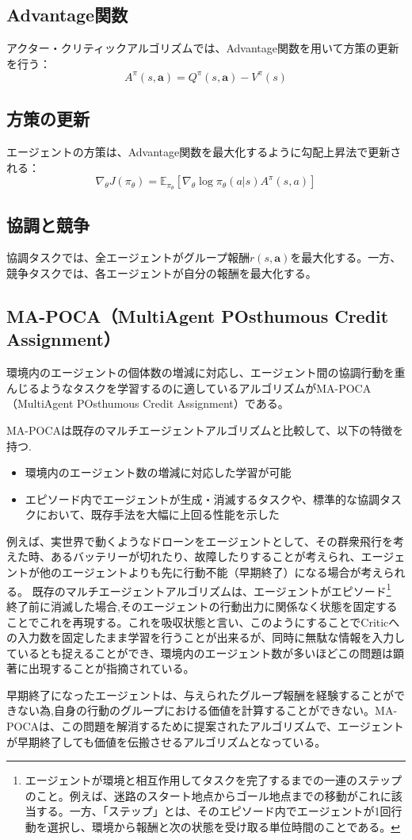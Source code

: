\subsection*{Advantage関数}
アクター・クリティックアルゴリズムでは、Advantage関数を用いて方策の更新を行う：
\[
A^\pi(s, \boldsymbol{a}) = Q^\pi(s, \boldsymbol{a}) - V^\pi(s)
\]

\subsection*{方策の更新}
エージェントの方策は、Advantage関数を最大化するように勾配上昇法で更新される：
\[
\nabla_\theta J(\pi_\theta) = \mathbb{E}_{\pi_\theta} \left[ \nabla_\theta \log \pi_\theta(a | s) A^\pi(s, a) \right]
\]

\subsection*{協調と競争}
協調タスクでは、全エージェントがグループ報酬$r(s, \boldsymbol{a})$を最大化する。一方、競争タスクでは、各エージェントが自分の報酬を最大化する。

\subsection{MA-POCA（MultiAgent POsthumous Credit Assignment）}
  環境内のエージェントの個体数の増減に対応し、エージェント間の協調行動を重んじるようなタスクを学習するのに適しているアルゴリズムがMA-POCA（MultiAgent POsthumous Credit Assignment）\cite{mapoca}である。\par 
  MA-POCAは既存のマルチエージェントアルゴリズムと比較して、以下の特徴を持つ.
  \begin{itemize}
    \item 環境内のエージェント数の増減に対応した学習が可能
    \item エピソード内でエージェントが生成・消滅するタスクや、標準的な協調タスクにおいて、既存手法を大幅に上回る性能を示した
  \end{itemize}
  例えば、実世界で動くようなドローンをエージェントとして、その群衆飛行を考えた時、あるバッテリーが切れたり、故障したりすることが考えられ、エージェントが他のエージェントよりも先に行動不能（早期終了）になる場合が考えられる。
  既存のマルチエージェントアルゴリズムは、エージェントがエピソード\footnote{エージェントが環境と相互作用してタスクを完了するまでの一連のステップのこと。例えば、迷路のスタート地点からゴール地点までの移動がこれに該当する。一方、「ステップ」とは、そのエピソード内でエージェントが1回行動を選択し、環境から報酬と次の状態を受け取る単位時間のことである。}
  終了前に消滅した場合,そのエージェントの行動出力に関係なく状態を固定することでこれを再現する。これを吸収状態と言い、このようにすることでCriticへの入力数を固定したまま学習を行うことが出来るが、同時に無駄な情報を入力しているとも捉えることができ、環境内のエージェント数が多いほどこの問題は顕著に出現することが指摘されている。\par
  早期終了になったエージェントは、与えられたグループ報酬を経験することができない為,自身の行動のグループにおける価値を計算することができない。MA-POCAは、この問題を解消するために提案されたアルゴリズムで、エージェントが早期終了しても価値を伝搬させるアルゴリズムとなっている。\par
